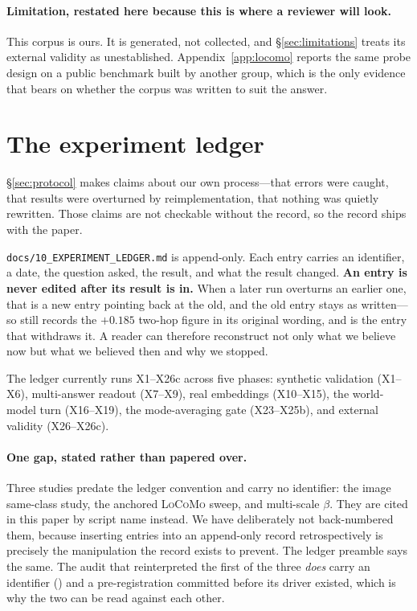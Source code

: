\paragraph{Limitation, restated here because this is where a reviewer will look.} This corpus
is ours. It is generated, not collected, and \S\ref{sec:limitations} treats its external
validity as unestablished. Appendix~\ref{app:locomo} reports the same probe design on a
public benchmark built by another group, which is the only evidence that bears on whether
the corpus was written to suit the answer.

\section{The experiment ledger}
\label{app:ledger}

\S\ref{sec:protocol} makes claims about our own process---that errors were caught, that
results were overturned by reimplementation, that nothing was quietly rewritten. Those
claims are not checkable without the record, so the record ships with the paper.

\texttt{docs/10\_EXPERIMENT\_LEDGER.md} is append-only. Each entry carries an identifier, a
date, the question asked, the result, and what the result changed. \textbf{An entry is never
edited after its result is in.} When a later run overturns an earlier one, that is a new
entry pointing back at the old, and the old entry stays as written---so  still
records the $+0.185$ two-hop figure in its original wording, and  is the entry
that withdraws it. A reader can therefore reconstruct not only what we believe now but what
we believed then and why we stopped.

The ledger currently runs X1--X26c across five phases: synthetic validation (X1--X6),
multi-answer readout (X7--X9), real embeddings (X10--X15), the world-model turn
(X16--X19), the mode-averaging gate (X23--X25b), and external validity (X26--X26c).

\paragraph{One gap, stated rather than papered over.} Three studies predate the ledger
convention and carry no  identifier: the image same-class study, the anchored
\textsc{LoCoMo} sweep, and multi-scale $\beta$. They are cited in this paper by script name
instead. We have deliberately not back-numbered them, because inserting entries into an
append-only record retrospectively is precisely the manipulation the record exists to
prevent. The ledger preamble says the same. The audit that reinterpreted the first of the
three \emph{does} carry an identifier () and a pre-registration committed before
its driver existed, which is why the two can be read against each other.

